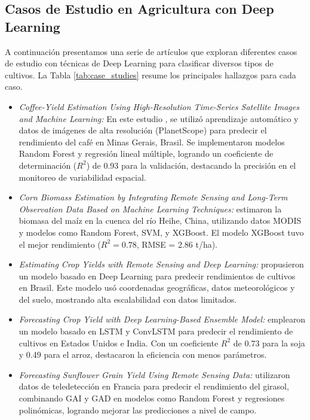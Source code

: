 \subsection{Casos de Estudio en Agricultura con Deep Learning}
A continuación presentamos una serie de artículos que exploran diferentes casos de estudio con técnicas de Deep Learning para clasificar diversos tipos de cultivos.  La Tabla \ref{tab:case_studies} resume los principales hallazgos para cada caso.

\begin{itemize}

    \item \textit{Coffee-Yield Estimation Using High-Resolution Time-Series Satellite Images and Machine Learning:} En este estudio \cite{martello2022}, se utilizó aprendizaje automático y datos de imágenes de alta resolución (PlanetScope) para predecir el rendimiento del café en Minas Gerais, Brasil. Se implementaron modelos Random Forest y regresión lineal múltiple, logrando un coeficiente de determinación ($R^2$) de 0.93 para la validación, destacando la precisión en el monitoreo de variabilidad espacial.

    \item \textit{Corn Biomass Estimation by Integrating Remote Sensing and Long-Term Observation Data Based on Machine Learning Techniques:} \cite{geng2021} estimaron la biomasa del maíz en la cuenca del río Heihe, China, utilizando datos MODIS y modelos como Random Forest, SVM, y XGBoost. El modelo XGBoost tuvo el mejor rendimiento ($R^2 = 0.78$, RMSE = 2.86 t/ha).

    \item \textit{Estimating Crop Yields with Remote Sensing and Deep Learning:} \cite{cunha2020} propusieron un modelo basado en Deep Learning para predecir rendimientos de cultivos en Brasil. Este modelo usó coordenadas geográficas, datos meteorológicos y del suelo, mostrando alta escalabilidad con datos limitados.

    \item \textit{Forecasting Crop Yield with Deep Learning-Based Ensemble Model:} \cite{divakar2022} emplearon un modelo basado en LSTM y ConvLSTM para predecir el rendimiento de cultivos en Estados Unidos e India. Con un coeficiente $R^2$ de 0.73 para la soja y 0.49 para el arroz, destacaron la eficiencia con menos parámetros.

    \item \textit{Forecasting Sunflower Grain Yield Using Remote Sensing Data:} \cite{debaeke2023} utilizaron datos de teledetección en Francia para predecir el rendimiento del girasol, combinando GAI y GAD en modelos como Random Forest y regresiones polinómicas, logrando mejorar las predicciones a nivel de campo.


\end{itemize}
